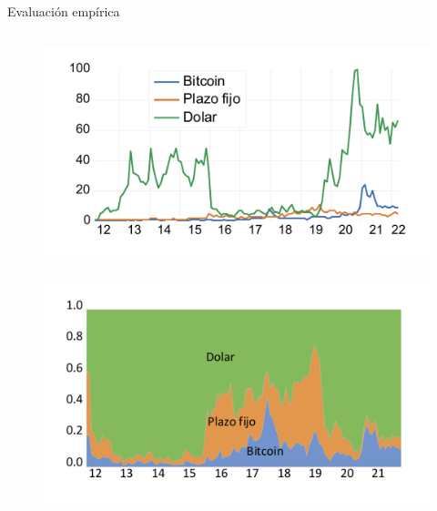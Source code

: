 \begin{frame}[t]
\begin{block}{Evaluación empírica}
\begin{minipage}[t][.4\textheight][t]{\textwidth}
        \begin{column}{0.5\textwidth}
    \tiny
    \begin{figure}[H]
        \begin{center}
             \includegraphics[width=1\textwidth]{images/C4/times_series_gtrend_tot.pdf} %
         \end{center}
    \end{figure}
    \end{column}
    \begin{column}{0.5\textwidth}  
    \tiny
    \begin{figure}[H]
        \begin{center}
         \includegraphics[width=1\textwidth]{images/C4/spike_gtrend_tot.pdf} %
        \end{center}
        
        \end{figure}
\end{column}

    \end{minipage}
\end{block}


\end{frame}
